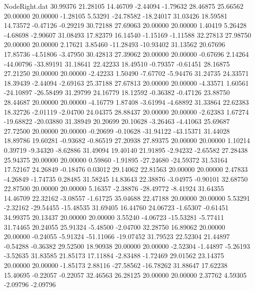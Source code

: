 \begin{filecontents}{NodeRight.dat}
  30.99376   21.28105   14.46709    -2.44094   -1.79632   28.46875   25.66562   20.00000   20.00000   -1.28105    5.53291  -24.78582  -18.24017
  31.03426   18.59581   14.73572    -0.47126   -0.29219   30.72188   27.69063   20.00000   20.00000    1.40419    5.26428   -4.68698   -2.90607
  31.08493   17.82379   16.14540    -1.15169   -1.11588   32.27813   27.98750   20.00000   20.00000    2.17621    3.85460  -11.28493  -10.93402
  31.13562   20.67696   17.85736    -4.51806   -3.47950   30.42813   27.39062   20.00000   20.00000   -0.67696    2.14264  -44.00796  -33.89191
  31.18641   22.42233   18.49510    -0.79357   -0.61451   28.16875   27.21250   20.00000   20.00000   -2.42233    1.50490   -7.67702   -5.94476
  31.24735   24.33571   18.39439    -2.44094   -2.69163   25.37188   27.67813   20.00000   20.00000   -4.33571    1.60561  -24.10897  -26.58499
  31.29799   24.16779   18.12592    -0.36382   -0.47126   23.88750   28.44687   20.00000   20.00000   -4.16779    1.87408   -3.61994   -4.68892
  31.33864   22.62383   18.32726    -2.01119   -2.04700   24.04375   28.88437   20.00000   20.00000   -2.62383    1.67274  -19.68822  -20.03880
  31.38949   20.20699   20.10628    -3.26463   -4.41063   25.69687   27.72500   20.00000   20.00000   -0.20699   -0.10628  -31.94122  -43.15371
  31.44028   18.89786   19.60281    -0.93682   -0.86519   27.20938   27.89375   20.00000   20.00000    1.10214    0.39719   -9.34320   -8.62886
  31.49094   19.40140   21.91895    -2.94232   -2.65582   27.28438   25.94375   20.00000   20.00000    0.59860   -1.91895  -27.24680  -24.59372
  31.53164   17.52167   24.26849    -0.18476    0.03012   29.14062   22.81563   20.00000   20.00000    2.47833   -4.26849   -1.74735    0.28485
  31.58245   14.83643   22.38876    -3.04975   -0.90101   32.68750   22.87500   20.00000   20.00000    5.16357   -2.38876  -28.49772   -8.41924
  31.64355   14.46709   22.32162    -3.08557   -1.61725   35.04688   22.47188   20.00000   20.00000    5.53291   -2.32162  -29.54455  -15.48535
  31.69405   16.44760   24.06723    -1.65307   -0.61451   34.99375   20.13437   20.00000   20.00000    3.55240   -4.06723  -15.53281   -5.77411
  31.74465   20.24055   25.91324    -5.48500   -2.04700   32.28750   16.89062   20.00000   20.00000   -0.24055   -5.91324  -51.11066  -19.07452
  31.79523   22.52304   21.44897    -0.54288   -0.36382   29.52500   18.90938   20.00000   20.00000   -2.52304   -1.44897   -5.26193   -3.52635
  31.83585   21.85173   17.11884    -2.83488   -1.72469   29.01562   23.14375   20.00000   20.00000   -1.85173    2.88116  -27.58562  -16.78262
  31.88647   17.62238   15.40695    -0.22057   -0.22057   32.46563   26.28125   20.00000   20.00000    2.37762    4.59305   -2.09796   -2.09796

\end{filecontents}
